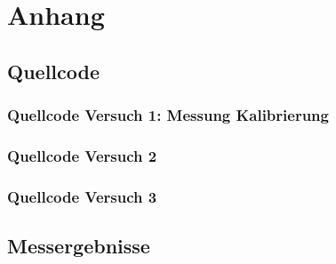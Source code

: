 \documentclass[12pt, oneside, a4paper, \docLanguage]{report}
\begin{document}
%
%
\renewcommand\thesection{A.\arabic{section}}
\renewcommand\thesubsection{\thesection.\arabic{subsection}}

\chapter*{Anhang}
\label{chap:APPENDIX}
\addtocounter{chapter}{1}
\setcounter{section}{0}

\section{Quellcode}
\label{chap:APPENDIX_SOURCECODE}

\subsection{Quellcode Versuch 1: Messung Kalibrierung}
\label{chap:APPENDIX_SOURCECODE_MEASURE}



\subsection{Quellcode Versuch 2}
\label{chap:APPENDIX_SOURCECODE_V2}

\subsection{Quellcode Versuch 3}
\label{chap:APPENDIX_SOURCECODE_V3}


\section{Messergebnisse}
\label{chap:APPENDIX_MEASUREMENT_SOURCE}

%
%
\addtocounter{chapter}{1}
\setcounter{section}{1}


\end{document}
